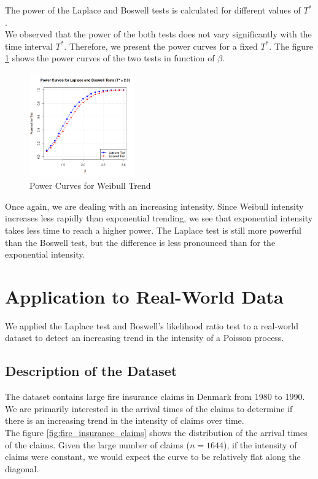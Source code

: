 \documentclass{journalstyle}
\begin{document}
The power of the Laplace and Boswell tests is calculated for different values of $T^*$. \\
We observed that the power of the both tests does not vary significantly with the time interval $T^*$.
Therefore, we present the power curves for a fixed $T^*$.
The figure \ref{fig:power_weibull_beta} shows the power curves of the two tests in function of $\beta$. \\
\begin{figure}[H]
    \centering
    \includegraphics[width=0.4\textwidth]{src/power_weibull.png}
    \caption{Power Curves for Weibull Trend}
    \label{fig:power_weibull_beta}
\end{figure}


Once again, we are dealing with an increasing intensity.
Since Weibull intensity increases less rapidly than exponential trending, we see that exponential intensity takes less time to reach a higher power.
The Laplace test is still more powerful than the Boswell test, but the difference is less pronounced than for the exponential intensity. \\


\section{Application to Real-World Data}

We applied the Laplace test and Boswell's likelihood ratio test to a real-world dataset to detect an increasing trend in the intensity of a Poisson process.

\subsection{Description of the Dataset}

The dataset contains large fire insurance claims in Denmark from 1980 to 1990.
We are primarily interested in the arrival times of the claims to determine if there is an increasing trend in the intensity of claims over time. \\
The figure \ref{fig:fire_insurance_claims} shows the distribution of the arrival times of the claims.
Given the large number of claims ($n = 1644$), if the intensity of claims were constant, we would expect the curve to be relatively flat along the diagonal. \\
\end{document}
